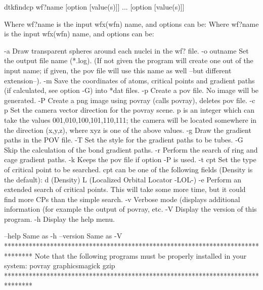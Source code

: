 	dtkfindcp wf?name [option [value(s)]] ... [option [value(s)]]

Where wf?name is the input wfx(wfn) name, and options can be:
Where wf?name is the input wfx(wfn) name, and options can be:

  -a        	Draw transparent spheres around each nuclei in the wf? file.
  -o outname	Set the output file name (*.log).
            	  (If not given the program will create one out of
            	  the input name; if given, the pov file will
            	  use this name as well --but different extension--).
  -m        	Save the coordinates of atoms, critical points and gradient
            	  paths (if calculated, see option -G) into *dat files.
  -p     	Create a pov file. No image will be generated.
  -P     	Create a png image using povray (calls povray),
         	  deletes pov file.
  -c p   	Set the camera vector direction for the povray scene.
         	  p is an integer which can take the values
         	  001,010,100,101,110,111; the camera will be located
         	  somewhere in the direction (x,y,z), where xyz is one of 
         	  the above values.
  -g     	Draw the gradient paths in the POV file.
  -T     	Set the style for the gradient paths to be tubes.
  -G     	Skip the calculation of the bond gradient paths.
  -r     	Perform the search of ring and cage gradient paths.
  -k     	Keeps the pov file if option -P is used.
  -t cpt 	Set the type of critical point to be searched. cpt can be 
         	  one of the following fields (Density is the default):
         		d (Density)
         		L (Localized Orbital Locator -LOL-)
  -e     	Perform an extended search of critical points. This
         	  will take some more time, but it could find more CPs
         	  than the simple search.
  -v     	Verbose mode (displays additional information (for example the 
         	  output of povray, etc.
  -V        	Display the version of this program.
  -h		Display the help menu.

  --help    		Same as -h
  --version 		Same as -V
********************************************************************************
  Note that the following programs must be properly installed in your system:
                                     povray
                                 graphicsmagick
                                      gzip
********************************************************************************
